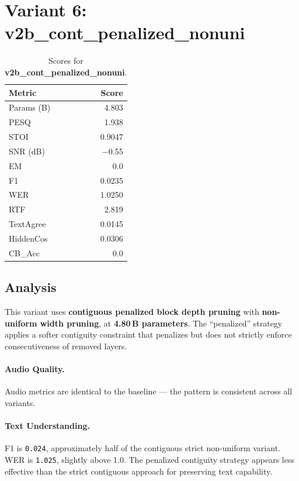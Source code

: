 \documentclass[11pt,a4paper]{article}
\newcommand{\scoreval}[1]{\texttt{#1}}
\begin{document}
\newpage
\section{Variant 6: v2b\_cont\_penalized\_nonuni}

\begin{table}[H]
\centering
\caption{Scores for \textbf{v2b\_cont\_penalized\_nonuni}.}
\begin{tabular}{l r}
\toprule
\textbf{Metric} & \textbf{Score} \\
\midrule
Params (B)    & 4.803 \\
PESQ          & 1.938 \\
STOI          & 0.9047 \\
SNR (dB)      & $-$0.55 \\
EM            & 0.0 \\
F1            & 0.0235 \\
WER           & 1.0250 \\
RTF           & 2.819 \\
TextAgree     & 0.0145 \\
HiddenCos     & 0.0306 \\
CB\_Acc       & 0.0 \\
\bottomrule
\end{tabular}
\end{table}

\subsection{Analysis}

This variant uses \textbf{contiguous penalized block depth pruning} with \textbf{non-uniform width pruning}, at \textbf{4.80\,B parameters}. The ``penalized'' strategy applies a softer contiguity constraint that penalizes but does not strictly enforce consecutiveness of removed layers.

\paragraph{Audio Quality.}
Audio metrics are identical to the baseline — the pattern is consistent across all variants.

\paragraph{Text Understanding.}
F1 is \scoreval{0.024}, approximately half of the contiguous strict non-uniform variant. WER is \scoreval{1.025}, slightly above 1.0. The penalized contiguity strategy appears less effective than the strict contiguous approach for preserving text capability.
\end{document}
